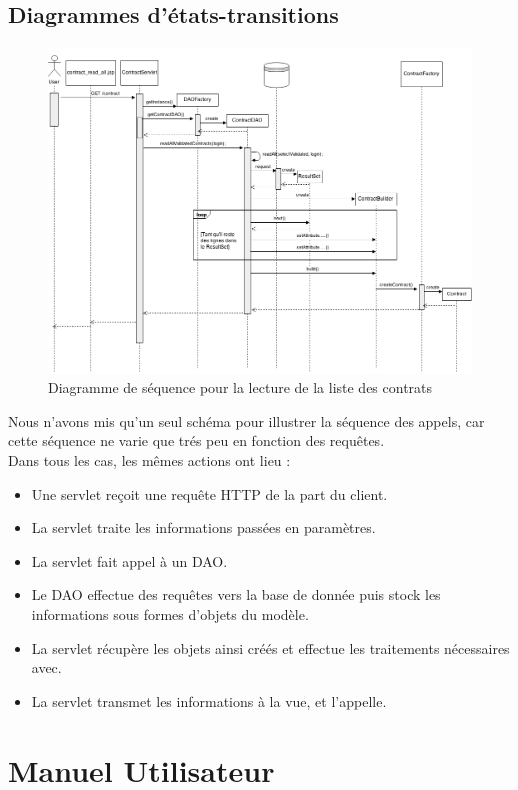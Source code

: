 \documentclass[12pt]{report}
\begin{document}
\subsection{Diagrammes d'états-transitions}
\begin{figure}[!hp]
\centering
\includegraphics[width=1.\textwidth]{./ressources/seq_contrats.png}
\caption{Diagramme de séquence pour la lecture de la liste des contrats}
\end{figure}
\clearpage
Nous n'avons mis qu'un seul schéma pour illustrer la séquence des appels, car cette séquence ne varie que trés peu en fonction des requêtes.\\
Dans tous les cas, les mêmes actions ont lieu :
\begin{itemize}
\item Une servlet reçoit une requête HTTP de la part du client.
\item La servlet traite les informations passées en paramètres.
\item La servlet fait appel à un DAO.
\item Le DAO effectue des requêtes vers la base de donnée puis stock les informations sous formes d'objets du modèle.
\item La servlet récupère les objets ainsi créés et effectue les traitements nécessaires avec.
\item La servlet transmet les informations à la vue, et l'appelle.
\end{itemize}

\clearpage
\section{Manuel Utilisateur}
\end{document}
